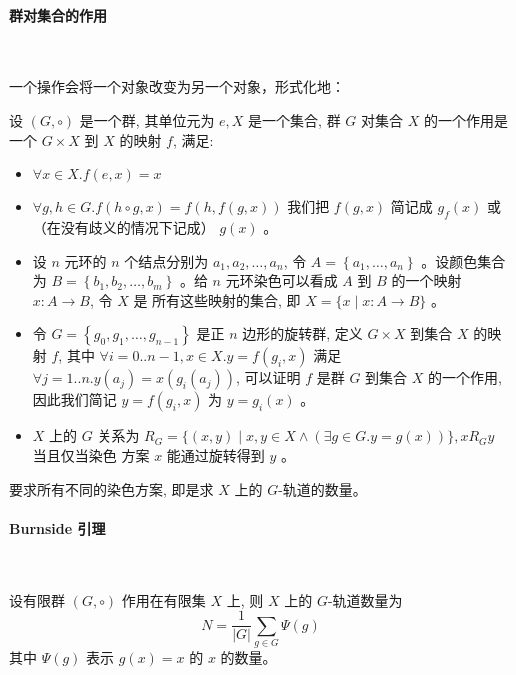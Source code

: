 \paragraph{群对集合的作用}\

一个操作会将一个对象改变为另一个对象，形式化地：

设 $(G, \circ)$ 是一个群, 其单位元为 $e, X$ 是一个集合, 群 $G$ 对集合 $X$ 的一个作用是一个 $G \times X$ 到 $X$ 的映射 $f$, 满足:

\begin{itemize}
    \item $\forall x \in X . f(e, x)=x$
    \item $\forall g, h \in G . f(h \circ g, x)=f(h, f(g, x))$
    我们把 $f(g, x)$ 简记成 $g_{f}(x)$ 或（在没有歧义的情况下记成） $g(x)$ 。
\end{itemize}

\begin{itemize}
    \item 设 $n$ 元环的 $n$ 个结点分别为 $a_{1}, a_{2}, \ldots, a_{n}$, 令 $A=\left\{a_{1}, \ldots, a_{n}\right\}$ 。设颜色集合为 $B=\left\{b_{1}, b_{2}, \ldots, b_{m}\right\}$ 。给 $n$ 元环染色可以看成 $A$ 到 $B$ 的一个映射 $x: A \rightarrow B$, 令 $X$ 是 所有这些映射的集合, 即 $X=\{x \mid x: A \rightarrow B\}$ 。
    \item 令 $G=\left\{g_{0}, g_{1}, \ldots, g_{n-1}\right\}$ 是正 $n$ 边形的旋转群, 定义 $G \times X$ 到集合 $X$ 的映射 $f$, 其中 $\forall i=0 . . n-1, x \in X . y=f\left(g_{i}, x\right)$ 满足 $\forall j=1 . . n . y\left(a_{j}\right)=x\left(g_{i}\left(a_{j}\right)\right)$, 可以证明 $f$ 是群 $G$ 到集合 $X$ 的一个作用, 因此我们简记 $y=f\left(g_{i}, x\right)$ 为 $y=g_{i}(x)$ 。
    \item $X$ 上的 $G$ 关系为 $R_{G}=\{(x, y) \mid x, y \in X \wedge(\exists g \in G . y=g(x))\}, x R_{G} y$ 当且仅当染色 方案 $x$ 能通过旋转得到 $y$ 。
\end{itemize}

要求所有不同的染色方案, 即是求 $X$ 上的 $G$-轨道的数量。\\

\paragraph{Burnside 引理}\

设有限群 $(G, \circ)$ 作用在有限集 $X$ 上, 则 $X$ 上的 $G$-轨道数量为
$$
N=\frac{1}{|G|} \sum_{g \in G} \Psi(g)
$$
其中 $\Psi(g)$ 表示 $g(x)=x$ 的 $x$ 的数量。\\

